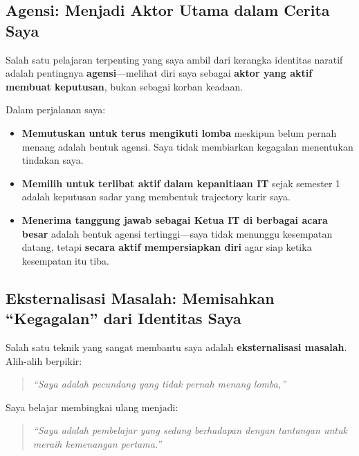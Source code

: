 \documentclass[
  letterpaper,
  DIV=11,
  numbers=noendperiod]{scrreprt}
\begin{document}
\subsection{\texorpdfstring{\textbf{Agensi: Menjadi Aktor Utama dalam
Cerita
Saya}}{Agensi: Menjadi Aktor Utama dalam Cerita Saya}}\label{agensi-menjadi-aktor-utama-dalam-cerita-saya}

Salah satu pelajaran terpenting yang saya ambil dari kerangka identitas
naratif adalah pentingnya \textbf{agensi}---melihat diri saya sebagai
\textbf{aktor yang aktif membuat keputusan}, bukan sebagai korban
keadaan.

Dalam perjalanan saya:

\begin{itemize}
\item
  \textbf{Memutuskan untuk terus mengikuti lomba} meskipun belum pernah
  menang adalah bentuk agensi. Saya tidak membiarkan kegagalan
  menentukan tindakan saya.
\item
  \textbf{Memilih untuk terlibat aktif dalam kepanitiaan IT} sejak
  semester 1 adalah keputusan sadar yang membentuk trajectory karir
  saya.
\item
  \textbf{Menerima tanggung jawab sebagai Ketua IT di berbagai acara
  besar} adalah bentuk agensi tertinggi---saya tidak menunggu kesempatan
  datang, tetapi \textbf{secara aktif mempersiapkan diri} agar siap
  ketika kesempatan itu tiba.
\end{itemize}

\subsection{\texorpdfstring{\textbf{Eksternalisasi Masalah: Memisahkan
``Kegagalan'' dari Identitas
Saya}}{Eksternalisasi Masalah: Memisahkan ``Kegagalan'' dari Identitas Saya}}\label{eksternalisasi-masalah-memisahkan-kegagalan-dari-identitas-saya}

Salah satu teknik yang sangat membantu saya adalah
\textbf{eksternalisasi masalah}. Alih-alih berpikir:

\begin{quote}
\emph{``Saya adalah pecundang yang tidak pernah menang lomba,''}
\end{quote}

Saya belajar membingkai ulang menjadi:

\begin{quote}
\emph{``Saya adalah pembelajar yang sedang berhadapan dengan tantangan
untuk meraih kemenangan pertama.''}
\end{quote}
\end{document}
